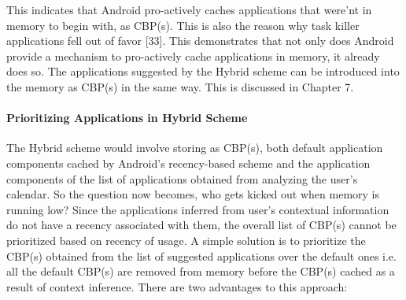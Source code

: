 \documentclass[12pt]{uthesis-v12}  %
\begin{document}
					This indicates that Android pro-actively caches applications that were'nt in memory to begin with, as CBP(s). This is also the reason why task killer applications fell out of favor [33]. This demonstrates that not only does Android provide a mechanism to pro-actively cache applications in memory, it already does so. The applications suggested by the Hybrid scheme can be introduced into the memory as CBP(s) in the same way. This is discussed in Chapter 7.

				\paragraph{Prioritizing Applications in Hybrid Scheme}	
					The Hybrid scheme would involve storing as CBP(s), both default application components cached by Android's recency-based scheme and the application components of the list of applications obtained from analyzing the user's calendar. So the question now becomes, who gets kicked out when memory is running low? Since the applications inferred from user's contextual information do not have a recency associated with them, the overall list of CBP(s) cannot be prioritized based on recency of usage. A simple solution is to prioritize the CBP(s) obtained from the list of suggested applications over the default ones i.e. all the default CBP(s) are removed from memory before the CBP(s) cached as a result of context inference. There are two advantages to this approach:
					
\end{document}
